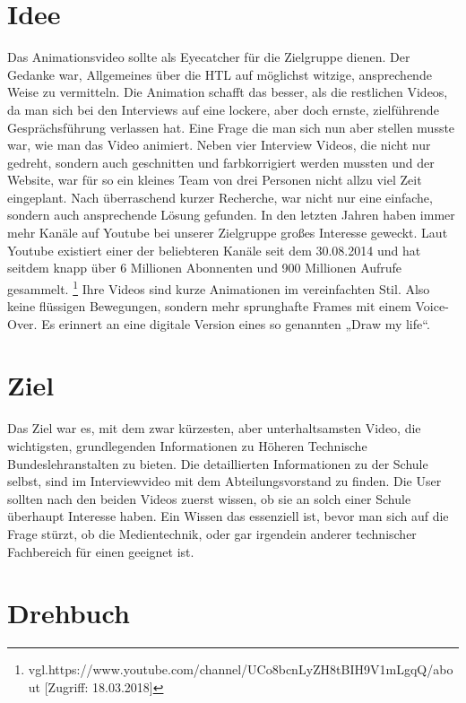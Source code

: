 \section{Idee}
\renewcommand{\kapitelautor}{Autor: Niklas Kienreich}
Das Animationsvideo sollte als Eyecatcher für die Zielgruppe dienen. Der Gedanke war, Allgemeines über die HTL auf möglichst witzige, ansprechende Weise zu vermitteln. Die Animation schafft das besser, als die restlichen Videos, da man sich bei den Interviews auf eine lockere, aber doch ernste, zielführende Gesprächsführung verlassen hat. Eine Frage die man sich nun aber stellen musste war, wie man das Video animiert. Neben vier Interview Videos, die nicht nur gedreht, sondern auch geschnitten und farbkorrigiert werden mussten und der Website, war für so ein kleines Team von drei Personen nicht allzu viel Zeit eingeplant. Nach überraschend kurzer Recherche, war nicht nur eine einfache, sondern auch ansprechende Lösung gefunden. In den letzten Jahren haben immer mehr Kanäle auf Youtube bei unserer Zielgruppe großes Interesse geweckt. Laut Youtube existiert einer der beliebteren Kanäle seit dem 30.08.2014 und hat seitdem knapp über 6 Millionen Abonnenten und 900 Millionen Aufrufe gesammelt. \footnote{\label{} vgl.https://www.youtube.com/channel/UCo8bcnLyZH8tBIH9V1mLgqQ/about [Zugriff: 18.03.2018]} Ihre Videos sind kurze Animationen im vereinfachten Stil. Also keine flüssigen Bewegungen, sondern mehr sprunghafte Frames mit einem Voice-Over. Es erinnert an eine digitale Version eines so genannten „Draw my life“.
\section{Ziel}
\renewcommand{\kapitelautor}{Autor: Niklas Kienreich}
Das Ziel war es, mit dem zwar kürzesten, aber unterhaltsamsten Video, die wichtigsten, grundlegenden Informationen zu Höheren Technische Bundeslehranstalten zu bieten. Die detaillierten Informationen zu der Schule selbst, sind im Interviewvideo mit dem Abteilungsvorstand zu finden. Die User sollten nach den beiden Videos zuerst wissen, ob sie an solch einer Schule überhaupt Interesse haben. Ein Wissen das essenziell ist, bevor man sich auf die Frage stürzt, ob die Medientechnik, oder gar irgendein anderer technischer Fachbereich für einen geeignet ist.
\section{Drehbuch}
\renewcommand{\kapitelautor}{Autor: Niklas Kienreich}
